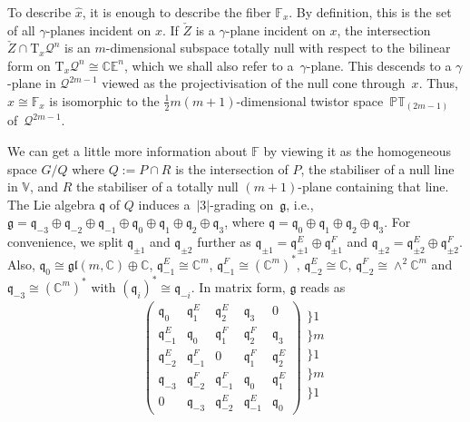 \documentclass[pdftex]{sigma}
\numberwithin{equation}{section}
\newcommand{\mc} [1]{\mathcal{#1}}
\newcommand{\Tgt} {\mathrm{T}}
\newcommand{\glie} {\mathfrak{gl}}
\newcommand{\g} {\mathfrak{g}}
\newcommand{\mfq} {\mathfrak{q}}
\newcommand{\PT} {\mathbb{PT}}
\newcommand{\E} {\mathbb{E}}
\newcommand{\C} {\mathbb{C}}
\newcommand{\F} {\mathbb{F}}
\newcommand{\V} {\mathbb{V}}
\begin{document}
To describe $\hat{x}$, it is enough to describe the f\/iber $\F_x$. By def\/inition, this is the set of all $\gamma$-planes incident on $x$. If $\check{Z}$ is a $\gamma$-plane incident on $x$, the intersection~$\check{Z} \cap \Tgt_x \mc{Q}^n$ is an $m$-dimensional subspace totally null with respect to the bilinear form on $\Tgt_x \mc{Q}^n \cong \C \E^n$, which we shall also refer to a~$\gamma$-plane. This descends to a $\gamma$-plane in $\mc{Q}^{2m-1}$ viewed as the projectivisation of the null cone through~$x$. Thus, $\hat{x} \cong \F_x$ is isomorphic to the $\frac{1}{2}m(m+1)$-dimensional twistor space~$\PT_{(2m-1)}$ of~$\mc{Q}^{2m-1}$.

We can get a little more information about $\F$ by viewing it as the homogeneous space $G/Q$ where $Q:=P \cap R$ is the intersection of $P$, the stabiliser of a null line in $\V$, and $R$ the stabiliser of a totally null $(m+1)$-plane containing that line. The Lie algebra $\mfq$ of $Q$ induces a~$|3|$-grading on~$\g$, i.e., $\g = \mfq_{-3} \oplus \mfq_{-2} \oplus \mfq_{-1} \oplus \mfq_0 \oplus \mfq_1 \oplus \mfq_2 \oplus \mfq_3$, where $\mfq = \mfq_0 \oplus \mfq_1 \oplus \mfq_2 \oplus \mfq_3$. For convenience, we split $\mfq_{\pm1}$ and $\mfq_{\pm2}$ further as $\mfq_{\pm1} = \mfq_{\pm1}^E \oplus \mfq_{\pm1}^F$ and $\mfq_{\pm2} = \mfq_{\pm2}^E \oplus \mfq_{\pm2}^F$. Also, $\mfq_0 \cong \glie(m,\C) \oplus \C$, $\mfq_{-1}^E \cong \C^m$, $\mfq_{-1}^F \cong (\C^m)^*$, $\mfq_{-2}^E \cong \C$, $\mfq_{-2}^F \cong \wedge^2 \C^m$ and $\mfq_{-3} \cong (\C^m)^*$ with $(\mfq_i)^* \cong \mfq_{-i}$. In matrix form, $\g$ reads as
\begin{gather*}
\left(
 \begin{array}{c|c|c|c|c}
\mfq_0 & \mfq_1^E & \mfq_2^E & \mfq_3 & 0 \\\hline 
\mfq_{-1}^E & \mfq_0 & \mfq_1^F & \mfq_2^F & \mfq_3 \\\hline 
\mfq_{-2}^E & \mfq_{-1}^F & 0 & \mfq_1^F & \mfq_2^E \\\hline 
\mfq_{-3} & \mfq_{-2}^F & \mfq_{-1}^F & \mfq_0 & \mfq_1^E \\\hline 
0 & \mfq_{-3} & \mfq_{-2}^E & \mfq_{-1}^E & \mfq_0
\end{array} \right)
\begin{array}{l}
\} \scriptscriptstyle{1} \\ \} \scriptscriptstyle{m} \\ \} \scriptscriptstyle{1} \\ \} \scriptscriptstyle{m} \\ \} \scriptscriptstyle{1} \\
\end{array}
\end{gather*}
\end{document}
